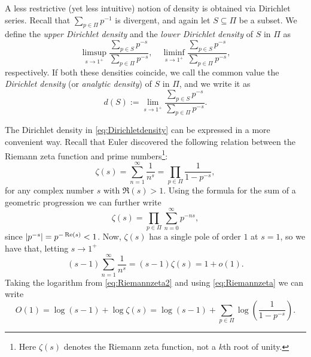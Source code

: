 \documentclass[../main.tex]{subfiles}
\begin{document}
A less restrictive (yet less intuitive) notion of density is obtained via Dirichlet series. Recall that $\sum_{p\in\Pi}p^{-1}$ is divergent, and again let $S\subseteq\Pi$ be a subset. We define the \emph{upper Dirichlet density} and the \emph{lower Dirichlet density} of $S$ in $\Pi$ as
	\begin{equation*}
		\limsup_{s\rightarrow 1^+}\frac{\sum_{p\in S}p^{-s}}{\sum_{p\in \Pi}p^{-s}}, \quad \liminf_{s\rightarrow 1^+}\frac{\sum_{p\in S}p^{-s}}{\sum_{p\in \Pi}p^{-s}},
	\end{equation*}
	respectively. If both these densities coincide, we call the common value the \emph{Dirichlet density} (or \emph{analytic density}) of $S$ in $\Pi$, and we write it as
	\begin{equation}\label{eq:Dirichletdensity}
		d(S):=\lim_{s\rightarrow1^+}\frac{\sum_{p\in S}p^{-s}}{\sum_{p\in \Pi}p^{-s}}.
	\end{equation}

The Dirichlet density in \cref{eq:Dirichletdensity} can be expressed in a more convenient way. Recall that Euler discovered the following relation between the Riemann zeta function and prime numbers\footnote{Here $\zeta(s)$ denotes the Riemann zeta function, not a $k$th root of unity.}:
\begin{equation}\label{eq:Riemannzeta}
	\zeta(s)=\sum_{n=1}^{\infty}\frac{1}{n^s}=\prod_{p\in \Pi}\frac{1}{1-p^{-s}},
\end{equation}
for any complex number $s$ with $\Re(s)>1$. Using the formula for the sum of a geometric progression we can further write
\begin{equation*}
	\zeta(s)=\prod_{p\in \Pi}\sum_{n=0}^{\infty}p^{-ns},
\end{equation*}
since $\abs{p^{-s}}=p^{-\Re(s)}<1$. Now, $\zeta(s)$ has a single pole of order $1$ at $s=1$, so we have that, letting $s\rightarrow1^+$
\begin{equation}\label{eq:Riemannzeta2}
	(s-1)\sum_{n=1}^{\infty}\frac{1}{n^s}=(s-1)\zeta(s)=1+o(1).
\end{equation} 
Taking the logarithm from \cref{eq:Riemannzeta2} and using \cref{eq:Riemannzeta} we can write
\begin{equation}\label{eq:Riemannzeta3}
	O(1)=\log(s-1)+\log\zeta(s)=\log(s-1)+\sum_{p\in \Pi}\log(\frac{1}{1-p^{-s}}).
\end{equation}
\end{document}
